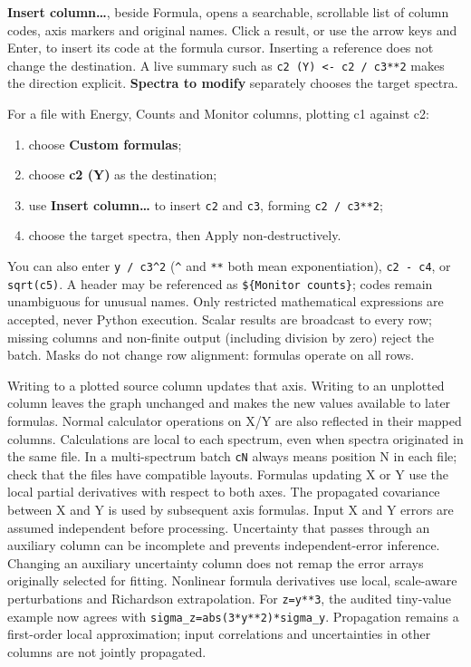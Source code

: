 \documentclass[
  10pt,
  a4paper,
  oneside]{scrreprt}
\providecommand{\tightlist}{%
  \setlength{\itemsep}{0pt}\setlength{\parskip}{0pt}}
\begin{document}
\textbf{Insert column\ldots{}}, beside Formula, opens a searchable,
scrollable list of column codes, axis markers and original names. Click
a result, or use the arrow keys and Enter, to insert its code at the
formula cursor. Inserting a reference does not change the destination. A
live summary such as \texttt{c2\ (Y)\ \textless{}-\ c2\ /\ c3**2} makes
the direction explicit. \textbf{Spectra to modify} separately chooses
the target spectra.

For a file with Energy, Counts and Monitor columns, plotting c1 against
c2:

\begin{enumerate}
\def\labelenumi{\arabic{enumi}.}
\tightlist
\item
  choose \textbf{Custom formulas};
\item
  choose \textbf{c2 (Y)} as the destination;
\item
  use \textbf{Insert column\ldots{}} to insert \texttt{c2} and
  \texttt{c3}, forming \texttt{c2\ /\ c3**2};
\item
  choose the target spectra, then Apply non-destructively.
\end{enumerate}

You can also enter \texttt{y\ /\ c3\^{}2} (\texttt{\^{}} and \texttt{**}
both mean exponentiation), \texttt{c2\ -\ c4}, or \texttt{sqrt(c5)}. A
header may be referenced as \texttt{\$\{Monitor\ counts\}}; codes remain
unambiguous for unusual names. Only restricted mathematical expressions
are accepted, never Python execution. Scalar results are broadcast to
every row; missing columns and non-finite output (including division by
zero) reject the batch. Masks do not change row alignment: formulas
operate on all rows.

Writing to a plotted source column updates that axis. Writing to an
unplotted column leaves the graph unchanged and makes the new values
available to later formulas. Normal calculator operations on X/Y are
also reflected in their mapped columns. Calculations are local to each
spectrum, even when spectra originated in the same file. In a
multi-spectrum batch \texttt{cN} always means position N in each file;
check that the files have compatible layouts. Formulas updating X or Y
use the local partial derivatives with respect to both axes. The
propagated covariance between X and Y is used by subsequent axis
formulas. Input X and Y errors are assumed independent before
processing. Uncertainty that passes through an auxiliary column can be
incomplete and prevents independent-error inference. Changing an
auxiliary uncertainty column does not remap the error arrays originally
selected for fitting. Nonlinear formula derivatives use local,
scale-aware perturbations and Richardson extrapolation. For
\texttt{z=y**3}, the audited tiny-value example now agrees with
\texttt{sigma\_z=abs(3*y**2)*sigma\_y}. Propagation remains a
first-order local approximation; input correlations and uncertainties in
other columns are not jointly propagated.
\end{document}
